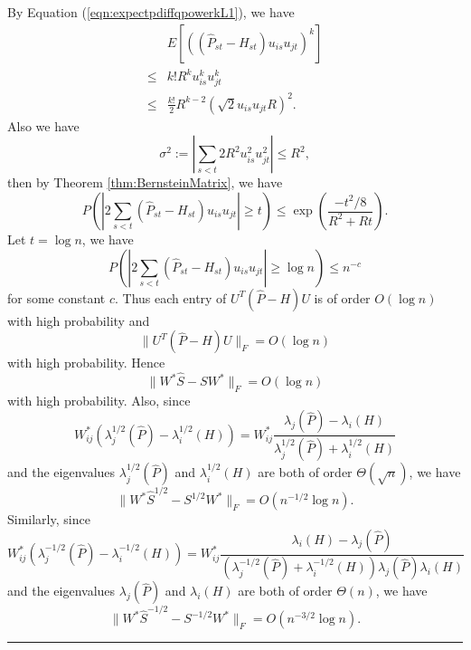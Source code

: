 \documentclass[a4paper]{article}
\newenvironment{proof}{{\bf Proof:  }}{\hfill\rule{2mm}{2mm}}
\begin{document}
\begin{proof}
By Equation (\ref{eqn:expectpdiffqpowerkL1}), we have
\begin{align*}
	& E\left[\left((\hat{P}_{st} - H_{st}) u_{is} u_{jt}\right)^k\right] \\ 
    \le & k! R^k u_{is}^k u_{jt}^k \\
    \le & \frac{k!}{2} R^{k-2} (\sqrt{2} u_{is} u_{jt} R)^2.
\end{align*}
Also we have
\[
	\sigma^2 := |\sum_{s<t} 2 R^2 u_{is}^2 u_{jt}^2| \le R^2,
\]
then by Theorem \ref{thm:BernsteinMatrix}, we have
\[
	P \left( \left| 2 \sum_{s<t} (\hat{P}_{st} - H_{st}) u_{is} u_{jt} \right| \ge t \right)
    \le \exp \left( \frac{-t^2/8}{R^2 + R t} \right).
\]
Let $t = \log n$, we have
\[
P \left( \left| 2 \sum_{s<t} (\hat{P}_{st} - H_{st}) u_{is} u_{jt} \right| \ge \log n \right)
    \le n^{-c}
\]
for some constant $c$.
Thus each entry of $U^T(\hat{P} - H)U$ is of order $O(\log n)$ with high probability and
\begin{equation}
\label{eqn:uPhatdiffHuL1}
	\|U^T(\hat{P} - H)U\|_F = O(\log n)
\end{equation}
with high probability.
Hence
\[
	\| W^* \hat{S} - S W^* \|_F = O(\log n)
\]
with high probability.
Also, since
\[
	W_{ij}^* (\lambda_j^{1/2}(\hat{P}) - \lambda_i^{1/2}(H)) = W_{ij}^* \frac{\lambda_j(\hat{P}) - \lambda_i(H)}{\lambda_j^{1/2}(\hat{P}) + \lambda_i^{1/2}(H)}
\]
and the eigenvalues $\lambda_j^{1/2}(\hat{P})$ and $\lambda_i^{1/2}(H)$ are both of order $\Theta(\sqrt{n})$, we have
\[
	\| W^* \hat{S}^{1/2} - S^{1/2} W^* \|_F = O(n^{-1/2} \log n).
\]
Similarly, since
\[
	W_{ij}^* (\lambda_j^{-1/2}(\hat{P}) - \lambda_i^{-1/2}(H)) = W_{ij}^* \frac{\lambda_i(H) - \lambda_j(\hat{P})}{(\lambda_j^{-1/2}(\hat{P}) + \lambda_i^{-1/2}(H))\lambda_j(\hat{P}) \lambda_i(H)}
\]
and the eigenvalues $\lambda_j(\hat{P})$ and $\lambda_i(H)$ are both of order $\Theta(n)$, we have
\[
	\| W^* \hat{S}^{-1/2} - S^{-1/2} W^* \|_F = O(n^{-3/2} \log n).
\]
\end{proof}
\end{document}
